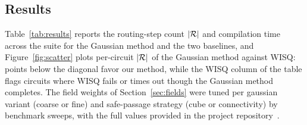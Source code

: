 \subsection{Results}

Table~\ref{tab:results} reports the routing-step count $|\mathcal{R}|$ and compilation
time across the suite for the Gaussian method and the two baselines, and
Figure~\ref{fig:scatter} plots per-circuit $|\mathcal{R}|$ of the Gaussian method against
WISQ: points below
the diagonal favor our method, while the WISQ column of the table flags circuits
where WISQ fails or times out though the Gaussian method completes. The field
weights of Section~\ref{sec:fields} were tuned per gaussian variant (coarse or fine) 
and safe-passage strategy (cube or connectivity) 
by benchmark sweeps, with the full values provided in the project repository~\cite{ftqc}.





